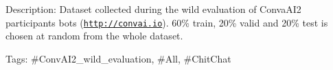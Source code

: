 Description\+: Dataset collected during the wild evaluation of Conva\+A\+I2 participants bots (\href{http://convai.io}{\tt http\+://convai.\+io}). 60\% train, 20\% valid and 20\% test is chosen at random from the whole dataset.

Tags\+: \#\+Conv\+A\+I2\+\_\+wild\+\_\+evaluation, \#\+All, \#\+Chit\+Chat 